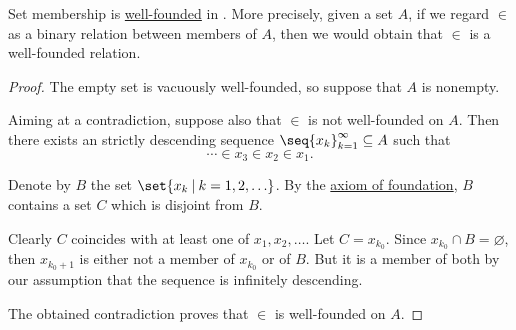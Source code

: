 \begin{proposition}\label{thm:set_membership_is_well_founded}
  Set membership is \hyperref[rem:well_founded_relation]{well-founded} in . More precisely, given a set \( A \), if we regard \( \in \) as a binary relation between members of \( A \), then we would obtain that \( \in \) is a well-founded relation.
\end{proposition}
\begin{proof}
  The empty set is vacuously well-founded, so suppose that \( A \) is nonempty.

  Aiming at a contradiction, suppose also that \( \in \) is not well-founded on \( A \). Then there exists an strictly descending sequence \( \seq{ x_k }_{k=1}^\infty \subseteq A \) such that
  \begin{equation*}
    \cdots \in x_3 \in x_2 \in x_1.
  \end{equation*}

  Denote by \( B \) the set \( \set{ x_k \given k = 1, 2, \ldots } \). By the \hyperref[def:zfc/foundation]{axiom of foundation}, \( B \) contains a set \( C \) which is disjoint from \( B \).

  Clearly \( C \) coincides with at least one of \( x_1, x_2, \ldots \). Let \( C = x_{k_0} \). Since \( x_{k_0} \cap B = \varnothing \), then \( x_{k_0 + 1} \) is either not a member of \( x_{k_0} \) or of \( B \). But it is a member of both by our assumption that the sequence is infinitely descending.

  The obtained contradiction proves that \( \in \) is well-founded on \( A \).
\end{proof}

